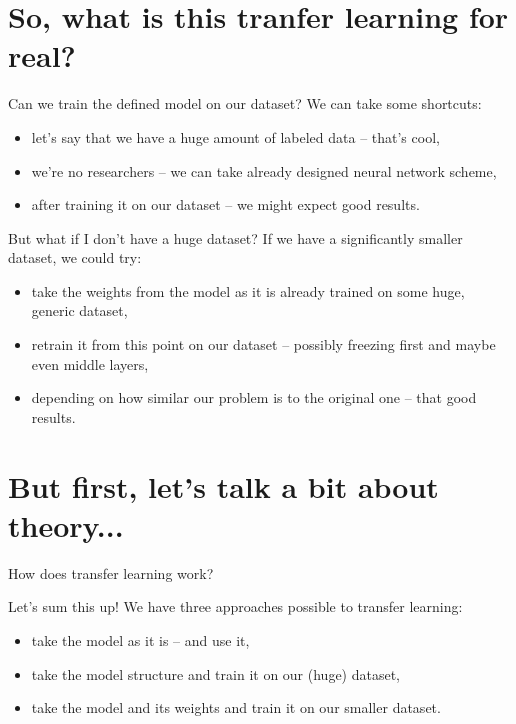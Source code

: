 \documentclass[aspectratio=1610,english]{beamer} %
\begin{document}
\section{So, what is this tranfer learning for real?}
 	\begin{frame}{Can we train the defined model on our dataset?}
 	We can take some shortcuts:
		\begin{itemize}
			\item let's say that we have a huge amount of labeled data -- that's cool,
			\item we're no researchers -- we can take already designed neural network scheme,
			\item after training it on our dataset -- we might expect good results.
		\end{itemize}
	\end{frame}
 
 	\begin{frame}{But what if I don't have a huge dataset?}
 		If we have a significantly smaller dataset, we could try:
 		\begin{itemize}
		 	\item take the weights from the model as it is already trained on some huge, generic dataset,
		 	\item retrain it from this point on our dataset -- possibly freezing first and maybe even middle layers,
		 	\item depending on how similar our problem is to the original one -- that good results.
		 \end{itemize}
	\end{frame}

\section{But first, let's talk a bit about theory...}
  	\begin{frame}{How does transfer learning work?}
		\begin{center}
		\end{center}
	 \end{frame}
  	\begin{frame}{Let's sum this up!}
		We have three approaches possible to transfer learning:
		 \begin{itemize}
		 	\item take the model as it is -- and use it,
		 	\item take the model structure and train it on our (huge) dataset,
		 	\item take the model and its weights and train it on our smaller dataset.
		 \end{itemize}
	\end{frame}
\end{document}

